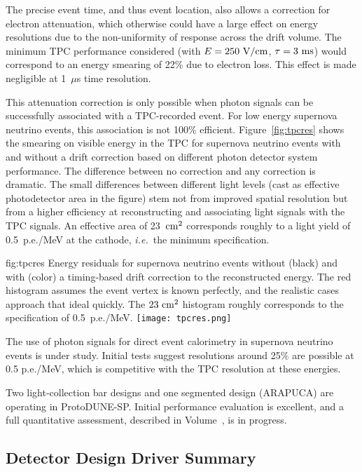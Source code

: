 The precise event time, and thus event location, also allows a 
correction for electron attenuation, which otherwise could have 
a large effect on energy resolutions due to the non-uniformity
of response across the drift volume.  
The minimum TPC performance 
considered (with $E=250~\rm{V/cm}$, $\tau=3~\rm{ms}$) would 
correspond to an energy smearing of 22\% due to electron loss.  
This effect is made negligible at 1~$\mu$s time resolution.

This attenuation correction is only possible when photon signals can be successfully associated with a TPC-recorded event.  For low energy supernova neutrino events, this association is not 
100\% efficient.  Figure~\ref{fig:tpcres} shows the smearing on visible energy in the TPC for supernova neutrino events with and without a drift correction based on different photon detector system performance.  The difference between no correction and any correction is dramatic.  The small differences between different light levels (cast as effective photodetector area in the figure) stem not from improved spatial resolution but from a higher efficiency at reconstructing and associating light signals with the TPC signals.  An effective area of 23~$\rm{cm}^2$ corresponds roughly to a light yield of 0.5~p.e./MeV at the cathode, {\em i.e.}\ the minimum specification.
%
\begin{dunefigure}
{fig:tpcres}
{Energy residuals for supernova neutrino events without (black) 
and with (color) a timing-based drift correction to the 
reconstructed energy.  The red histogram assumes the event 
vertex is known perfectly, and the realistic cases approach that
ideal quickly.  The $23~\rm{cm}^2$ histogram roughly corresponds 
to the specification of 0.5~p.e./MeV.}
  \texttt{[image: tpcres.png]}
\end{dunefigure}

The use of photon signals for direct event calorimetry in 
supernova neutrino events is under study. Initial tests suggest 
resolutions around 25\% are possible at 0.5 p.e./MeV, which is
competitive with the TPC resolution at these energies.

Two light-collection bar designs and one segmented design 
(ARAPUCA) are operating in ProtoDUNE-SP.  Initial performance 
evaluation is excellent, and a full quantitative assessment, 
described in Volume~\volnumbersp{}, \voltitlesp{}  
is in progress.

\subsection{Detector Design Driver Summary}

